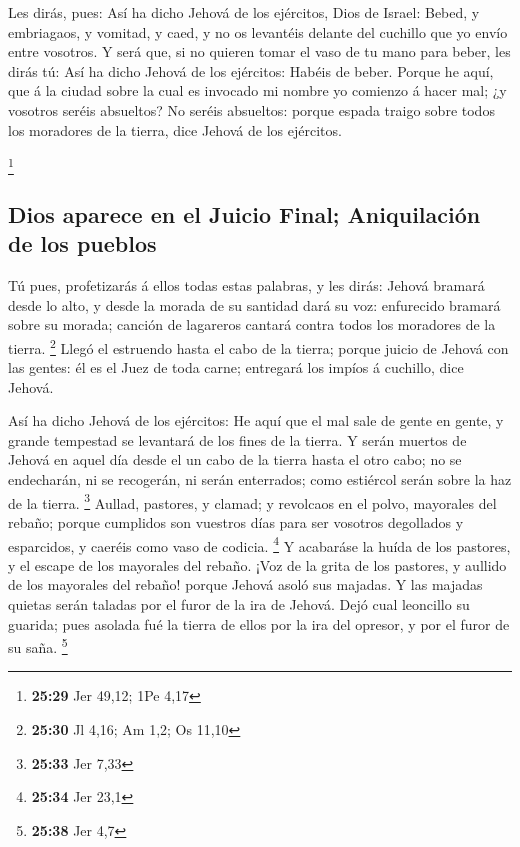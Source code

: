  Les dirás, pues: Así ha dicho Jehová de los ejércitos,
Dios de Israel: Bebed, y embriagaos, y vomitad, y caed, y no os
levantéis delante del cuchillo que yo envío entre vosotros.
 Y será que, si no quieren tomar el vaso de tu mano para
beber, les dirás tú: Así ha dicho Jehová de los ejércitos: Habéis de
beber.  Porque he aquí, que á la ciudad sobre la cual es
invocado mi nombre yo comienzo á hacer mal; ¿y vosotros seréis
absueltos? No seréis absueltos: porque espada traigo sobre todos los
moradores de la tierra, dice Jehová de los ejércitos.

\footnote{\textbf{25:29} Jer 49,12; 1Pe 4,17}

\hypertarget{dios-aparece-en-el-juicio-final-aniquilaciuxf3n-de-los-pueblos}{%
\subsection{Dios aparece en el Juicio Final; Aniquilación de los
pueblos}\label{dios-aparece-en-el-juicio-final-aniquilaciuxf3n-de-los-pueblos}}

 Tú pues, profetizarás á ellos todas estas palabras, y les
dirás: Jehová bramará desde lo alto, y desde la morada de su santidad
dará su voz: enfurecido bramará sobre su morada; canción de lagareros
cantará contra todos los moradores de la tierra. \footnote{\textbf{25:30}
  Jl 4,16; Am 1,2; Os 11,10}  Llegó el estruendo hasta el
cabo de la tierra; porque juicio de Jehová con las gentes: él es el Juez
de toda carne; entregará los impíos á cuchillo, dice Jehová.

 Así ha dicho Jehová de los ejércitos: He aquí que el mal
sale de gente en gente, y grande tempestad se levantará de los fines de
la tierra.  Y serán muertos de Jehová en aquel día desde el
un cabo de la tierra hasta el otro cabo; no se endecharán, ni se
recogerán, ni serán enterrados; como estiércol serán sobre la haz de la
tierra. \footnote{\textbf{25:33} Jer 7,33}  Aullad,
pastores, y clamad; y revolcaos en el polvo, mayorales del rebaño;
porque cumplidos son vuestros días para ser vosotros degollados y
esparcidos, y caeréis como vaso de codicia. \footnote{\textbf{25:34} Jer
  23,1}  Y acabaráse la huída de los pastores, y el escape
de los mayorales del rebaño.  ¡Voz de la grita de los
pastores, y aullido de los mayorales del rebaño! porque Jehová asoló sus
majadas.  Y las majadas quietas serán taladas por el furor
de la ira de Jehová.  Dejó cual leoncillo su guarida; pues
asolada fué la tierra de ellos por la ira del opresor, y por el furor de
su saña. \footnote{\textbf{25:38} Jer 4,7}


